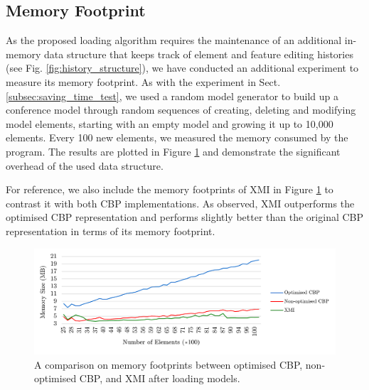 \documentclass{llncs}
\begin{document}
         
\subsection{Memory Footprint}
\label{subsec:memory_consumption}
As the proposed loading algorithm requires the maintenance of an additional in-memory data structure that keeps track of element and feature editing histories (see Fig. \ref{fig:history_structure}), we have conducted an additional experiment to measure its memory footprint. As with the experiment in Sect. \ref{subsec:saving_time_test}, we used a random model generator to build up a conference model through random sequences of creating, deleting and modifying model elements, starting with an empty model and growing it up to 10,000 elements. Every 100 new elements, we measured the memory consumed by the program. The results are plotted in Figure \ref{fig:memory_ocbp_cbp_xmi} and demonstrate the significant overhead of the used data structure.

For reference, we also include the memory footprints of XMI in Figure \ref{fig:memory_ocbp_cbp_xmi} to contrast it with both CBP implementations. As observed, XMI outperforms the optimised CBP representation and performs slightly better than the original CBP representation in terms of its memory footprint. 

\begin{figure}[b]	
\centering
\includegraphics[width=\linewidth]{memory_ocbp_cbp_xmi}
		\caption{A comparison on memory footprints between optimised CBP, non-optimised CBP, and XMI after loading models.}\label{fig:memory_ocbp_cbp_xmi}
\end{figure}
\end{document}
